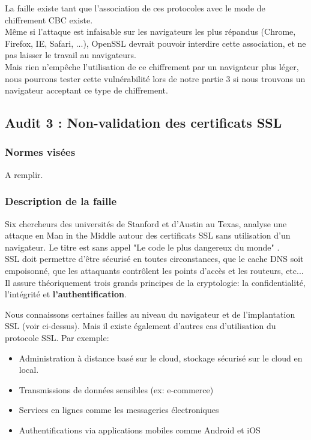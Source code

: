 			La faille existe tant que l'association de ces protocoles avec le mode de chiffrement CBC existe.\\
			
			Même si l'attaque est infaisable sur les navigateurs les plus répandus (Chrome, Firefox, IE, Safari, ...), OpenSSL devrait pouvoir interdire cette association, et ne pas laisser le travail au navigateurs.\\
			
			Mais rien n'empêche l'utilisation de ce chiffrement par un navigateur plus léger, nous pourrons tester cette vulnérabilité lors de notre partie 3 si nous trouvons un navigateur acceptant ce type de chiffrement.				
			
	\subsection{Audit 3 : Non-validation des certificats SSL}
		\subsubsection{Normes visées}
	
			A remplir.

		\subsubsection{Description de la faille}
		
			Six chercheurs des universités de Stanford et d'Austin au Texas, analyse une attaque en Man in the Middle autour des certificats SSL sans utilisation d'un navigateur. Le titre est sans appel "Le code le plus dangereux du monde" \cite{validate2012martin}.\\
			
			SSL doit permettre d'être sécurisé en toutes circonstances, que le cache DNS soit empoisonné, que les attaquants contrôlent les points d'accès et les routeurs, etc...\\
			
			Il assure théoriquement trois grands principes de la cryptologie: la confidentialité, l'intégrité et \textbf{l'authentification}.
		
			Nous connaissons certaines failles au niveau du navigateur et de l'implantation SSL (voir ci-dessus). Mais il existe également d'autres cas d'utilisation du protocole SSL. Par exemple:
			\begin{itemize}
			\item Administration à distance basé sur le cloud, stockage sécurisé sur le cloud en local.
			\item Transmissions de données sensibles (ex: e-commerce)
			\item Services en lignes comme les messageries électroniques
			\item Authentifications via applications mobiles comme Android et iOS
			\end{itemize}
			

